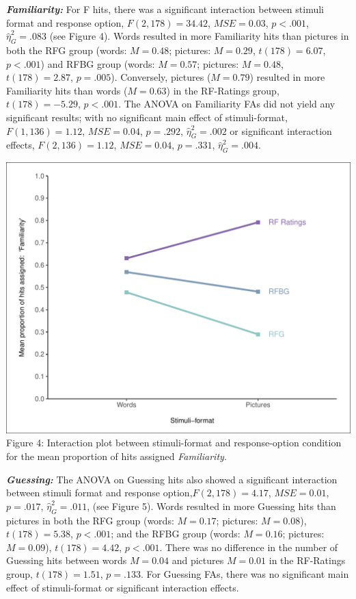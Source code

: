 \documentclass[
  11pt,
]{article}
\begin{document}
\textbf{\emph{Familiarity:}} For F hits, there was a significant
interaction between stimuli format and response option,
\(F(2, 178) = 34.42\), \(\mathit{MSE} = 0.03\), \(p < .001\),
\(\hat{\eta}^2_G = .083\) (see Figure 4). Words resulted in more
Familiarity hits than pictures in both the RFG group (words:
\(M = 0.48\); pictures: \(M = 0.29\), \(t(178) = 6.07\), \(p < .001\))
and RFBG group (words: \(M = 0.57\); pictures: \(M = 0.48\),
\(t(178) = 2.87\), \(p = .005\)). Conversely, pictures (\(M = 0.79\))
resulted in more Familiarity hits than words (\(M = 0.63\)) in the
RF-Ratings group, \(t(178) = -5.29\), \(p < .001\). The ANOVA on
Familiarity FAs did not yield any significant results; with no
significant main effect of stimuli-format, \(F(1, 136) = 1.12\),
\(\mathit{MSE} = 0.04\), \(p = .292\), \(\hat{\eta}^2_G = .002\) or
significant interaction effects, \(F(2, 136) = 1.12\),
\(\mathit{MSE} = 0.04\), \(p = .331\), \(\hat{\eta}^2_G = .004\).

\includegraphics{R--Thesis_files/figure-latex/unnamed-chunk-16-1.pdf}
Figure 4: Interaction plot between stimuli-format and response-option
condition for the mean proportion of hits assigned \emph{Familiarity}.

\textbf{\emph{Guessing:}} The ANOVA on Guessing hits also showed a
significant interaction between stimuli format and response
option,\(F(2, 178) = 4.17\), \(\mathit{MSE} = 0.01\), \(p = .017\),
\(\hat{\eta}^2_G = .011\), (see Figure 5). Words resulted in more
Guessing hits than pictures in both the RFG group (words: \(M = 0.17\);
pictures: \(M = 0.08\)), \(t(178) = 5.38\), \(p < .001\); and the RFBG
group (words: \(M = 0.16\); pictures: \(M = 0.09\)), \(t(178) = 4.42\),
\(p < .001\). There was no difference in the number of Guessing hits
between words \(M = 0.04\) and pictures \(M = 0.01\) in the RF-Ratings
group, \(t(178) = 1.51\), \(p = .133\). For Guessing FAs, there was no
significant main effect of stimuli-format or significant interaction
effects.
\end{document}
